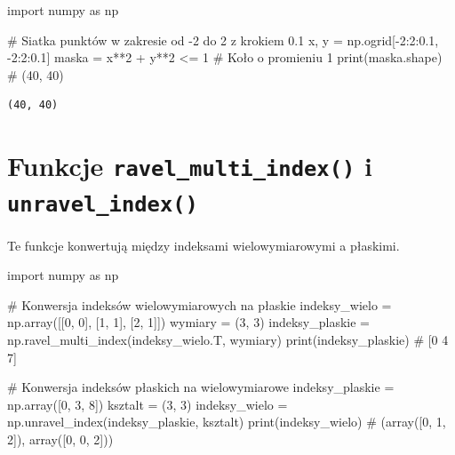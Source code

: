 \documentclass[
  polish,
  letterpaper,
  DIV=11,
  numbers=noendperiod]{scrreprt}
\newenvironment{Shaded}{\begin{snugshade}}{\end{snugshade}}
\newcommand{\BuiltInTok}[1]{\textcolor[rgb]{0.00,0.23,0.31}{#1}}
\newcommand{\CommentTok}[1]{\textcolor[rgb]{0.37,0.37,0.37}{#1}}
\newcommand{\DecValTok}[1]{\textcolor[rgb]{0.68,0.00,0.00}{#1}}
\newcommand{\FloatTok}[1]{\textcolor[rgb]{0.68,0.00,0.00}{#1}}
\newcommand{\ImportTok}[1]{\textcolor[rgb]{0.00,0.46,0.62}{#1}}
\newcommand{\NormalTok}[1]{\textcolor[rgb]{0.00,0.23,0.31}{#1}}
\newcommand{\OperatorTok}[1]{\textcolor[rgb]{0.37,0.37,0.37}{#1}}
\begin{document}
\begin{Shaded}
\begin{Highlighting}[]
\ImportTok{import}\NormalTok{ numpy }\ImportTok{as}\NormalTok{ np}

\CommentTok{\# Siatka punktów w zakresie od {-}2 do 2 z krokiem 0.1}
\NormalTok{x, y }\OperatorTok{=}\NormalTok{ np.ogrid[}\OperatorTok{{-}}\DecValTok{2}\NormalTok{:}\DecValTok{2}\NormalTok{:}\FloatTok{0.1}\NormalTok{, }\OperatorTok{{-}}\DecValTok{2}\NormalTok{:}\DecValTok{2}\NormalTok{:}\FloatTok{0.1}\NormalTok{]}
\NormalTok{maska }\OperatorTok{=}\NormalTok{ x}\OperatorTok{**}\DecValTok{2} \OperatorTok{+}\NormalTok{ y}\OperatorTok{**}\DecValTok{2} \OperatorTok{\textless{}=} \DecValTok{1}  \CommentTok{\# Koło o promieniu 1}
\BuiltInTok{print}\NormalTok{(maska.shape)  }\CommentTok{\# (40, 40)}
\end{Highlighting}
\end{Shaded}

\begin{verbatim}
(40, 40)
\end{verbatim}

\section{\texorpdfstring{Funkcje \texttt{ravel\_multi\_index()} i
\texttt{unravel\_index()}}{Funkcje ravel\_multi\_index() i unravel\_index()}}\label{funkcje-ravel_multi_index-i-unravel_index}

Te funkcje konwertują między indeksami wielowymiarowymi a płaskimi.

\begin{Shaded}
\begin{Highlighting}[]
\ImportTok{import}\NormalTok{ numpy }\ImportTok{as}\NormalTok{ np}

\CommentTok{\# Konwersja indeksów wielowymiarowych na płaskie}
\NormalTok{indeksy\_wielo }\OperatorTok{=}\NormalTok{ np.array([[}\DecValTok{0}\NormalTok{, }\DecValTok{0}\NormalTok{], [}\DecValTok{1}\NormalTok{, }\DecValTok{1}\NormalTok{], [}\DecValTok{2}\NormalTok{, }\DecValTok{1}\NormalTok{]])}
\NormalTok{wymiary }\OperatorTok{=}\NormalTok{ (}\DecValTok{3}\NormalTok{, }\DecValTok{3}\NormalTok{)}
\NormalTok{indeksy\_plaskie }\OperatorTok{=}\NormalTok{ np.ravel\_multi\_index(indeksy\_wielo.T, wymiary)}
\BuiltInTok{print}\NormalTok{(indeksy\_plaskie)  }\CommentTok{\# [0 4 7]}

\CommentTok{\# Konwersja indeksów płaskich na wielowymiarowe}
\NormalTok{indeksy\_plaskie }\OperatorTok{=}\NormalTok{ np.array([}\DecValTok{0}\NormalTok{, }\DecValTok{3}\NormalTok{, }\DecValTok{8}\NormalTok{])}
\NormalTok{ksztalt }\OperatorTok{=}\NormalTok{ (}\DecValTok{3}\NormalTok{, }\DecValTok{3}\NormalTok{)}
\NormalTok{indeksy\_wielo }\OperatorTok{=}\NormalTok{ np.unravel\_index(indeksy\_plaskie, ksztalt)}
\BuiltInTok{print}\NormalTok{(indeksy\_wielo)  }\CommentTok{\# (array([0, 1, 2]), array([0, 0, 2]))}
\end{Highlighting}
\end{Shaded}
\end{document}
